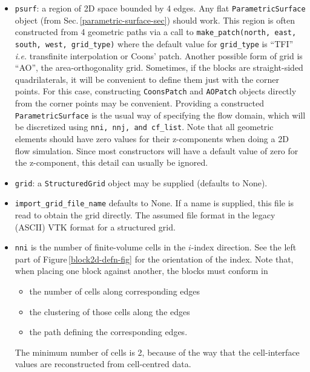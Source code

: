 \begin{itemize}
\item \texttt{psurf}: a region of 2D space bounded by 4 edges.
    Any flat \verb!ParametricSurface! object (from Sec.\,\ref{parametric-surface-sec}) should work.
    This region is often constructed from 4 geometric paths via a call to
    \texttt{make\_patch(north, east, south, west, grid\_type)} where the
    default value for \texttt{grid\_type} is ``TFI'' \textit{i.e.} transfinite interpolation
    or Coons' patch.
    Another possible form of grid is ``AO'', the area-orthogonality grid.
    Sometimes, if the blocks are straight-sided quadrilaterals, it will be convenient to define them
    just with the corner points.
    For this case, constructing \verb!CoonsPatch! and \verb!AOPatch! objects directly from the
    corner points may be convenient.
    Providing a constructed \verb!ParametricSurface! is the usual way of specifying the flow domain, 
    which will be discretized using \texttt{nni, nnj, and cf\_list}.
    Note that all geometric elements should have zero values for their z-components when
    doing a 2D flow simulation.
    Since most constructors will have a default value of zero for the z-component, this
    detail can usually be ignored.
\item \texttt{grid}: a \texttt{StructuredGrid} object may be supplied (defaults to None). 
\item \texttt{import\_grid\_file\_name} defaults to None.
  If a name is supplied, this file is read to obtain the grid directly.
  The assumed file format in the legacy (ASCII) VTK format for a structured grid.
\item \texttt{nni} is the number of finite-volume cells in the $i$-index
  direction. See the left part of Figure\,\ref{block2d-defn-fig} for the orientation of the index.
  Note that, when placing one block against another, the blocks must conform in
  \begin{itemize}
    \item the number of cells along corresponding edges
    \item the clustering of those cells along the edges
    \item the path defining the corresponding edges.
  \end{itemize}
  The minimum number of cells is 2, because of the way that the cell-interface values are 
  reconstructed from cell-centred data.

\end{itemize}
